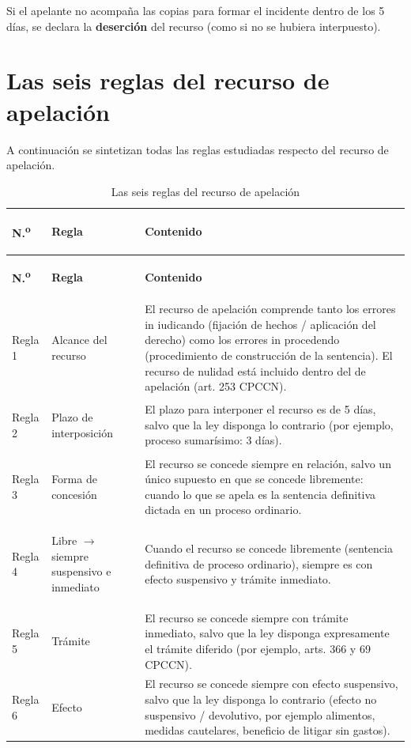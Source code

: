 \documentclass[12pt,oneside]{book}
\begin{document}
Si el apelante no acompaña las copias para formar el incidente dentro de los 5 días, se declara la \textbf{deserción} del recurso (como si no se hubiera interpuesto).

\chapter{Las seis reglas del recurso de apelación}

A continuación se sintetizan todas las reglas estudiadas respecto del recurso de apelación.

\begin{longtable}{
    >{\bfseries\raggedright\arraybackslash}p{1.4cm}
    >{\bfseries\raggedright\arraybackslash}p{3.4cm}
    >{\raggedright\arraybackslash}p{9.2cm}
}
\caption{Las seis reglas del recurso de apelación} \\
\toprule
\textbf{N.\textsuperscript{o}} & \textbf{Regla} & \textbf{Contenido} \\
\midrule
\endfirsthead
\toprule
\textbf{N.\textsuperscript{o}} & \textbf{Regla} & \textbf{Contenido} \\
\midrule
\endhead
\bottomrule
\endfoot
Regla 1 & Alcance del recurso & El recurso de apelación comprende tanto los errores in iudicando (fijación de hechos / aplicación del derecho) como los errores in procedendo (procedimiento de construcción de la sentencia). El recurso de nulidad está incluido dentro del de apelación (art. 253 CPCCN). \\
Regla 2 & Plazo de interposición & El plazo para interponer el recurso es de 5 días, salvo que la ley disponga lo contrario (por ejemplo, proceso sumarísimo: 3 días). \\
Regla 3 & Forma de concesión & El recurso se concede siempre en relación, salvo un único supuesto en que se concede libremente: cuando lo que se apela es la sentencia definitiva dictada en un proceso ordinario. \\
Regla 4 & Libre $\rightarrow$ siempre suspensivo e inmediato & Cuando el recurso se concede libremente (sentencia definitiva de proceso ordinario), siempre es con efecto suspensivo y trámite inmediato. \\
Regla 5 & Trámite & El recurso se concede siempre con trámite inmediato, salvo que la ley disponga expresamente el trámite diferido (por ejemplo, arts. 366 y 69 CPCCN). \\
Regla 6 & Efecto & El recurso se concede siempre con efecto suspensivo, salvo que la ley disponga lo contrario (efecto no suspensivo / devolutivo, por ejemplo alimentos, medidas cautelares, beneficio de litigar sin gastos). \\
\end{longtable}
\end{document}
